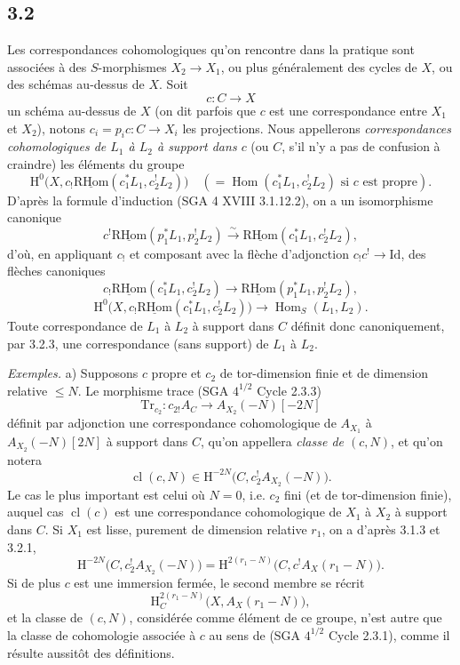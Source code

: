\documentclass[11pt]{article}
\renewcommand{\H}{\mathrm{H}}
\DeclareMathOperator{\Hom}{Hom}
\providecommand{\RHom}{\mathrm{RHom}}
\providecommand{\uRHom}{\underline{\RHom}}
\providecommand{\Id}{\mathrm{Id}}
\providecommand{\RHom}{\mathrm{RHom}}
\providecommand{\Hom}{\operatorname{Hom}}
\providecommand{\RHom}{\mathrm R\mathcal{H}om}
\providecommand{\RHom}{\mathrm{RHom}}
\providecommand{\Hom}{\operatorname{Hom}}
\begin{document}
\subsection*{3.2}
Les correspondances cohomologiques qu'on rencontre dans la pratique sont associées à des $S$-morphismes $X_2\to X_1$, ou plus généralement des cycles de $X$, ou des schémas au-dessus de $X$. Soit
\[
c:C\longrightarrow X
\]
un schéma au-dessus de $X$ (on dit parfois que $c$ est une correspondance entre $X_1$ et $X_2$), notons $c_i=p_ic:C\to X_i$ les projections. Nous appellerons \emph{correspondances cohomologiques de $L_1$ à $L_2$ à support dans $c$} (ou $C$, s'il n'y a pas de confusion à craindre) les éléments du groupe
\[
\H^0\bigl(X,c_!\uRHom(c_1^*L_1,c_2^!L_2)\bigr)
\quad(=\Hom(c_1^*L_1,c_2^!L_2)\text{ si }c\text{ est propre}).
\]
D'après la formule d'induction (SGA 4 XVIII 3.1.12.2), on a un isomorphisme canonique
\begin{equation}
c^!\uRHom(p_1^*L_1,p_2^!L_2)
\xrightarrow{\sim}
\uRHom(c_1^*L_1,c_2^!L_2),
\tag{3.2.1}
\end{equation}
d'où, en appliquant $c_!$ et composant avec la flèche d'adjonction $c_!c^!\to \Id$, des flèches canoniques
\begin{equation}
c_!\uRHom(c_1^*L_1,c_2^!L_2)
\longrightarrow
\uRHom(p_1^*L_1,p_2^!L_2),
\tag{3.2.2}
\end{equation}
\begin{equation}
\H^0\bigl(X,c_!\uRHom(c_1^*L_1,c_2^!L_2)\bigr)
\longrightarrow
\Hom_S(L_1,L_2).
\tag{3.2.3}
\end{equation}
Toute correspondance de $L_1$ à $L_2$ à support dans $C$ définit donc canoniquement, par 3.2.3, une correspondance (sans support) de $L_1$ à $L_2$.

\emph{Exemples.} a) Supposons $c$ propre et $c_2$ de tor-dimension finie et de dimension relative $\leq N$. Le morphisme trace (SGA $4^{1/2}$ Cycle 2.3.3)
\[
\mathrm{Tr}_{c_2}:c_{2!}A_C\longrightarrow A_{X_2}(-N)[-2N]
\]
définit par adjonction une correspondance cohomologique de $A_{X_1}$ à $A_{X_2}(-N)[2N]$ à support dans $C$, qu'on appellera \emph{classe de $(c,N)$}, et qu'on notera
\begin{equation}
\operatorname{cl}(c,N)\in \H^{-2N}\bigl(C,c_2^!A_{X_2}(-N)\bigr).
\tag{3.2.4}
\end{equation}
Le cas le plus important est celui où $N=0$, i.e. $c_2$ fini (et de tor-dimension finie), auquel cas $\operatorname{cl}(c)$ est une correspondance cohomologique de $X_1$ à $X_2$ à support dans $C$. Si $X_1$ est lisse, purement de dimension relative $r_1$, on a d'après 3.1.3 et 3.2.1,
\begin{equation}
\H^{-2N}\bigl(C,c_2^!A_{X_2}(-N)\bigr)
=
\H^{2(r_1-N)}\bigl(C,c^!A_X(r_1-N)\bigr).
\tag{3.2.5}
\end{equation}
Si de plus $c$ est une immersion fermée, le second membre se récrit
\[
\H^{2(r_1-N)}_C\bigl(X,A_X(r_1-N)\bigr),
\]
et la classe de $(c,N)$, considérée comme élément de ce groupe, n'est autre que la classe de cohomologie associée à $c$ au sens de (SGA $4^{1/2}$ Cycle 2.3.1), comme il résulte aussitôt des définitions.
\end{document}
